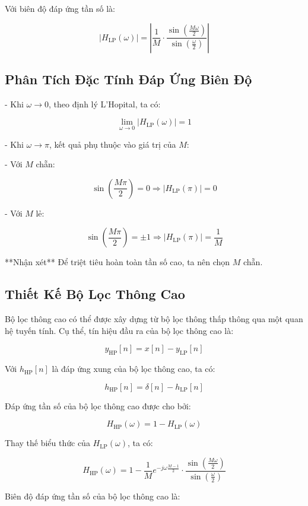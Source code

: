 Với biên độ đáp ứng tần số là:

\[
|H_{\mathrm{LP}}(\omega)| = \left| \frac{1}{M} \cdot \frac{\sin\left( \frac{M \omega}{2} \right)}{\sin\left( \frac{\omega}{2} \right)} \right|
\]

\subsection*{Phân Tích Đặc Tính Đáp Ứng Biên Độ}

- Khi \( \omega \to 0 \), theo định lý L'Hopital, ta có:

\[
\lim_{\omega \to 0} |H_{\mathrm{LP}}(\omega)| = 1
\]

- Khi \( \omega \to \pi \), kết quả phụ thuộc vào giá trị của \( M \):

- Với \( M \) chẵn:

\[
\sin\left(\frac{M\pi}{2}\right) = 0 \Rightarrow |H_{\mathrm{LP}}(\pi)| = 0
\]

- Với \( M \) lẻ:

\[
\sin\left(\frac{M\pi}{2}\right) = \pm 1 \Rightarrow |H_{\mathrm{LP}}(\pi)| = \frac{1}{M}
\]

**Nhận xét** Để triệt tiêu hoàn toàn tần số cao, ta nên chọn \( M \) chẵn.

\subsection*{Thiết Kế Bộ Lọc Thông Cao}

Bộ lọc thông cao có thể được xây dựng từ bộ lọc thông thấp thông qua một quan hệ tuyến tính. Cụ thể, tín hiệu đầu ra của bộ lọc thông cao là:

\[
y_{\mathrm{HP}}[n] = x[n] - y_{\mathrm{LP}}[n]
\]

Với \( h_{\mathrm{HP}}[n] \) là đáp ứng xung của bộ lọc thông cao, ta có:

\[
h_{\mathrm{HP}}[n] = \delta[n] - h_{\mathrm{LP}}[n]
\]

Đáp ứng tần số của bộ lọc thông cao được cho bởi:

\[
H_{\mathrm{HP}}(\omega) = 1 - H_{\mathrm{LP}}(\omega)
\]

Thay thế biểu thức của \( H_{\mathrm{LP}}(\omega) \), ta có:

\[
H_{\mathrm{HP}}(\omega) = 1 - \frac{1}{M} e^{-j \omega \frac{M-1}{2}} \cdot \frac{\sin\left(\frac{M \omega}{2}\right)}{\sin\left(\frac{\omega}{2}\right)}
\]

Biên độ đáp ứng tần số của bộ lọc thông cao là:

